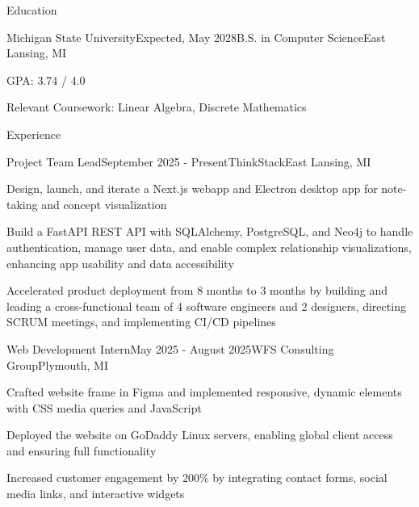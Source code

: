 \documentclass[
	11pt
]{../resume}
\begin{document}
	\begin{rSection}{E}{ducation}
		\begin{rSectionEntry}{Michigan State University}{Expected, May 2028}{B.S. in Computer Science}{East Lansing, MI}
			\item GPA: 3.74 / 4.0
			\item Relevant Coursework: Linear Algebra, Discrete Mathematics
		\end{rSectionEntry}
	\end{rSection}

	\begin{rSection}{E}{xperience}
		\begin{rSectionEntry}{Project Team Lead}{September 2025 - Present}{ThinkStack}{East Lansing, MI}
			\item Design, launch, and iterate a Next.js webapp and Electron desktop app for note-taking and concept visualization
			\item Build a FastAPI REST API with SQLAlchemy, PostgreSQL, and Neo4j to handle authentication, manage user data, and enable complex relationship visualizations, enhancing app usability and data accessibility
			\item Accelerated product deployment from 8 months to 3 months by building and leading a cross-functional team of 4 software engineers and 2 designers, directing SCRUM meetings, and implementing CI/CD pipelines
		\end{rSectionEntry}

		\begin{rSectionEntry}{Web Development Intern}{May 2025 - August 2025}{WFS Consulting Group}{Plymouth, MI}
			\item Crafted website frame in Figma and implemented responsive, dynamic elements with CSS media queries and JavaScript
			\item Deployed the website on GoDaddy Linux servers, enabling global client access and ensuring full functionality
			\item Increased customer engagement by 200\% by integrating contact forms, social media links, and interactive widgets
		\end{rSectionEntry}
	\end{rSection}
\end{document}
